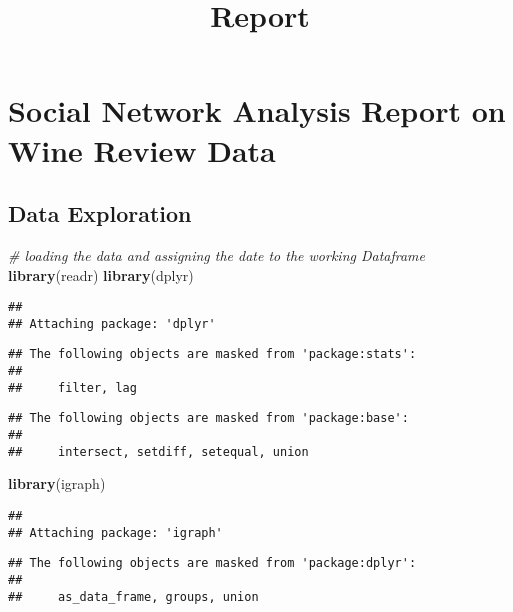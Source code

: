 \documentclass[
]{article}
\title{Report}
\author{}
\date{\vspace{-2.5em}}
\newenvironment{Shaded}{\begin{snugshade}}{\end{snugshade}}
\newcommand{\CommentTok}[1]{\textcolor[rgb]{0.56,0.35,0.01}{\textit{#1}}}
\newcommand{\FunctionTok}[1]{\textcolor[rgb]{0.13,0.29,0.53}{\textbf{#1}}}
\newcommand{\NormalTok}[1]{#1}
\begin{document}
\maketitle

\section{Social Network Analysis Report on Wine Review
Data}\label{social-network-analysis-report-on-wine-review-data}

\subsection{Data Exploration}\label{data-exploration}

\begin{Shaded}
\begin{Highlighting}[]
\CommentTok{\# loading the data and assigning the date to the working Dataframe}
\FunctionTok{library}\NormalTok{(readr)}
\FunctionTok{library}\NormalTok{(dplyr)}
\end{Highlighting}
\end{Shaded}

\begin{verbatim}
## 
## Attaching package: 'dplyr'
\end{verbatim}

\begin{verbatim}
## The following objects are masked from 'package:stats':
## 
##     filter, lag
\end{verbatim}

\begin{verbatim}
## The following objects are masked from 'package:base':
## 
##     intersect, setdiff, setequal, union
\end{verbatim}

\begin{Shaded}
\begin{Highlighting}[]
\FunctionTok{library}\NormalTok{(igraph)}
\end{Highlighting}
\end{Shaded}

\begin{verbatim}
## 
## Attaching package: 'igraph'
\end{verbatim}

\begin{verbatim}
## The following objects are masked from 'package:dplyr':
## 
##     as_data_frame, groups, union
\end{verbatim}
\end{document}
